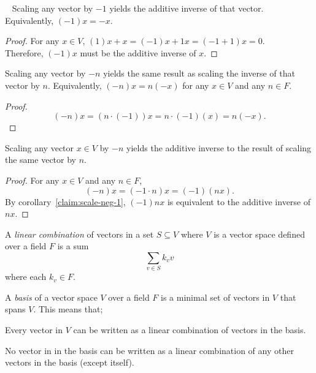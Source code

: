 \begin{corollary}~\label{claim:scale-neg-1}
  Scaling any vector by $-1$ yields the additive inverse of that vector.
  Equivalently, $(-1) x = -x$.

  \begin{proof}
    For any $x \in V$, $(1) x + x = (-1) x + 1x = (-1 + 1) x = 0$. \\
    Therefore, $(-1) x$ must be the additive inverse of $x$.
  \end{proof}
\end{corollary}

\begin{corollary}
  Scaling any vector by $-n$ yields the same result as scaling the inverse
  of that vector by $n$.
  Equivalently, $(-n) x = n (-x)$ for any $x \in V$ and any $n \in F$.

  \begin{proof}
    \[ (-n) x = (n \cdot (-1)) x = n \cdot (-1) (x) = n (-x). \]
  \end{proof}
\end{corollary}

\begin{corollary}
  Scaling any vector $x \in V$ by $-n$ yields the additive inverse to the result
  of scaling the same vector by $n$.

  \begin{proof}
    For any $x \in V$ and any $n \in F$,
    \[ (-n) x = (-1 \cdot n) x = (-1) (n x). \]
    By corollary~\ref{claim:scale-neg-1}, $(-1) nx$ is equivalent to the additive inverse of $nx$.
  \end{proof}
\end{corollary}

\begin{definition}
  A \emph{linear combination} of vectors in a set $S \subseteq V$ where $V$ is a vector space defined
  over a field $F$ is a sum \[ \sum_{v \in S} k_v v \] where each $k_v \in F$.
\end{definition}

\begin{definition}
  A \emph{basis} of a vector space $V$ over a field $F$ is a minimal set of vectors in $V$
  that spans $V$. This means that;
  \begin{enumroman}
    \item Every vector in $V$ can be written as a linear combination of vectors in the basis.
    \item No vector in in the basis can be written as a linear combination of any
      other vectors in the basis (except itself).
  \end{enumroman}
\end{definition}

